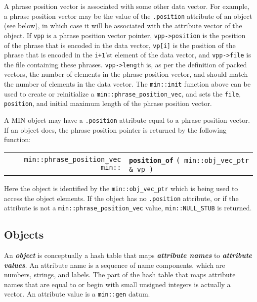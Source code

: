 \documentclass[12pt]{article}
\makeatletter
\newcommand{\key}[1]{{\bf \em #1}\index{#1}}
\newcommand{\skey}[2]{{\bf \em #1#2}\index{#1}}
\newcommand{\ttindex}[1]{\index{#1@{\tt #1}}}
\newcommand{\minindex}[1]{\ttindex{min::#1}\ttindex{#1}}
\newcommand{\EOL}{\penalty \exhyphenpenalty}
\newenvironment{indpar}[1][0.3in]%
	{\begin{list}{}%
		     {\setlength{\itemsep}{0in}%
		      \setlength{\topsep}{0in}%
		      \setlength{\parsep}{1ex}%
		      \setlength{\labelwidth}{#1}%
		      \setlength{\leftmargin}{#1}%
		      \addtolength{\leftmargin}{\labelsep}}%
	 \item}%
	{\end{list}}
\newcommand{\LABEL}[1]{\label{#1}}
\newcommand{\MINKEY}[1]{{\tt \bf #1}\minindex{#1}}
\makeatother
\begin{document}
A phrase position vector is associated with some other data vector.
For example, a phrase position vector may be the value of the
{\tt .position} attribute of an object
(see below), in which case it will be associated with
the attribute vector of the object.
If {\tt vpp} is a phrase position vector pointer, {\tt vpp->\EOL position}
is the position of the phrase that is encoded in the data vector,
{\tt vp[i]} is the position of the phrase that is encoded in
the {\tt i+1}'st element of the data vector, and
{\tt vpp->\EOL file} is the file containing these phrases.
{\tt vpp->\EOL length} is, as per the definition of packed vectors,
the number of elements in the phrase position vector, and should
match the number of elements in the data vector.
The {\tt min::\EOL init} function above can be used to create or
reinitialize a {\tt min::\EOL phrase\_\EOL position\_\EOL vec},
and sets the {\tt file}, {\tt position}, and initial maximum length
of the phrase position vector.

A MIN object may have a {\tt .position} attribute equal to a
phrase position vector.  If an object does, the phrase position
pointer is returned by the following function:

\begin{indpar}[1em]\begin{tabular}{r@{}l}
\verb|min::phrase_position_vec min::| & \MINKEY{position\_of}
    \verb|( min::obj_vec_ptr & vp )|
\LABEL{MIN::POSITION_OF_OBJECT_VEC_PTR} \\
\end{tabular}\end{indpar}

Here the object is identified by the {\tt min::\EOL obj\_\EOL vec\_\EOL ptr}
which is being used to access the object elements.  If the
object has no {\tt .position} attribute, or if the attribute is
not a {\tt min::\EOL phrase\_\EOL position\_\EOL vec} value,
{\tt min::\EOL NULL\_\EOL STUB} is returned.

\subsection{Objects}
\label{OBJECTS}

An \key{object} is conceptually a hash table that maps
\skey{attribute name}s to \skey{attribute value}s.
An attribute name is a sequence of name components, which
are numbers, strings, and labels.
The part of the hash table that maps attribute names that are equal to
or begin with small unsigned integers is actually a vector.
An attribute value is a \verb|min::gen| datum.
\end{document}
